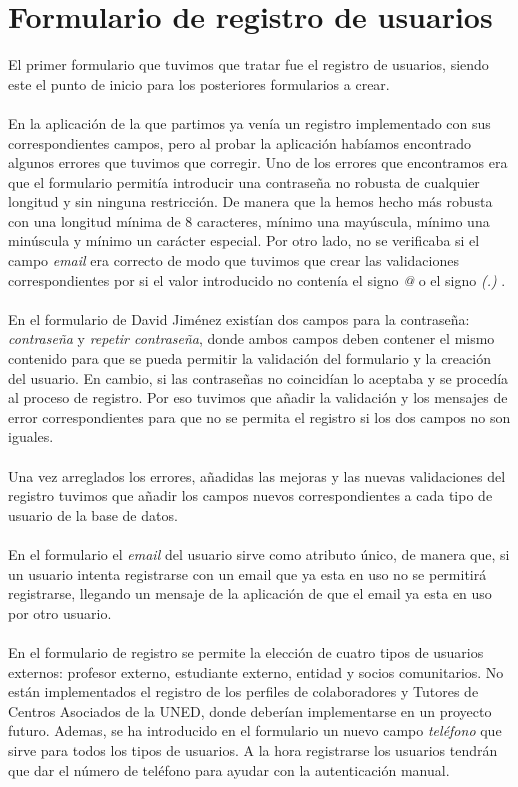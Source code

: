 \documentclass[11pt]{book}
\begin{document}
 \section{Formulario de registro de usuarios}
 El primer formulario que tuvimos que tratar fue el registro de usuarios, siendo este el punto de inicio para los posteriores formularios a crear.\\\\
 En la aplicación de la que partimos ya venía un registro implementado con sus correspondientes campos, pero al probar la aplicación habíamos encontrado algunos errores que tuvimos que corregir. Uno de los errores que encontramos era que el formulario permitía introducir una contraseña no robusta de cualquier longitud y sin ninguna restricción. De manera que la hemos hecho más robusta con una longitud mínima de 8 caracteres, mínimo una mayúscula, mínimo una minúscula y mínimo un carácter especial. Por otro lado, no se verificaba si el campo \emph{email} era correcto de modo que tuvimos que crear las validaciones correspondientes por si el valor introducido no contenía el signo \emph{@} o el signo \emph{(.)} .\\\\
 En el formulario de David Jiménez existían dos campos para la contraseña: \emph{contraseña} y   \emph{repetir contraseña}, donde ambos campos deben contener el mismo contenido para que se pueda permitir la validación del formulario y la creación del usuario. En cambio, si las contraseñas no coincidían lo aceptaba y se procedía al proceso de registro. Por eso tuvimos que añadir la validación y los mensajes de error correspondientes para que no se permita el registro si los dos campos no son iguales.\\\\
 Una vez arreglados los errores, añadidas las mejoras y las nuevas validaciones del registro tuvimos que añadir los campos nuevos correspondientes a cada tipo de usuario de la base de datos. \\\\
 En el formulario el \emph{email} del usuario sirve como atributo único, de manera que, si un usuario intenta registrarse con un email que ya esta en uso no se permitirá registrarse, llegando un mensaje de la aplicación de que el email ya esta en uso por otro usuario. \\\\
 En el formulario de registro se permite la elección de cuatro tipos de usuarios externos: profesor externo, estudiante externo, entidad y socios comunitarios. No están implementados el registro de los perfiles de colaboradores y Tutores de Centros Asociados de la UNED, donde deberían implementarse en un proyecto futuro. Ademas, se ha introducido en el formulario un nuevo campo \emph{teléfono} que sirve para todos los tipos de usuarios. A la hora registrarse los usuarios tendrán que dar el número de teléfono para ayudar con la autenticación manual.\\\\
\end{document}
